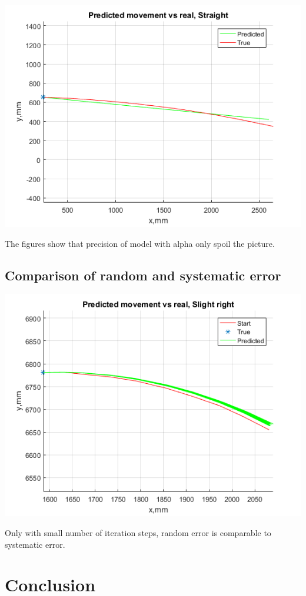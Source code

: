 \documentclass[a4paper, 12pt]{article}
\begin{document}
\includegraphics[scale = 0.8]{sa.png}

The figures show that precision of model with alpha only spoil the picture.

\subsection{Comparison of random and systematic error}

\includegraphics[scale = 1]{afan.png}

Only with small number of iteration steps, random error is comparable to systematic error.

\section{Conclusion}
\end{document}
